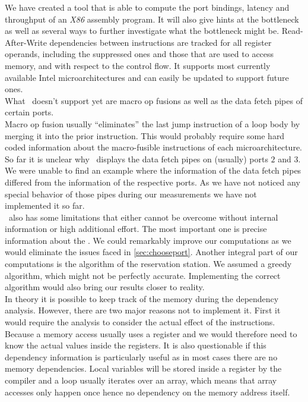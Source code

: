 
We have created a tool that is able to compute the port bindings, latency and throughput of an \emph{X86} assembly program. It will also give hints at the bottleneck as well as several ways to further investigate what the bottleneck might be. Read-After-Write dependencies between instructions are tracked for all register operands, including the suppressed ones and those that are used to access memory, and with respect to the control flow. It supports most currently available Intel microarchitectures and can easily be updated to support future ones.\\

What \suaca\ doesn't support yet are macro op fusions as well as the data fetch pipes of certain ports.\\
Macro op fusion usually ``eliminates'' the last jump instruction of a loop body by merging it into the prior instruction. This would probably require some hard coded information about the macro-fusible instructions of each microarchitecture.\\
So far it is unclear why \iaca\ displays the data fetch pipes on (usually) ports $2$ and $3$. We were unable to find an example where the information of the data fetch pipes differed from the information of the respective ports. As we have not noticed any special behavior of those pipes during our measurements we have not implemented it so far.\\

\suaca\ also has some limitations that either cannot be overcome without internal information or high additional effort.
The most important one is precise information about the \microops. We could remarkably improve our computations as we would eliminate the issues faced in \autoref{sec:chooseport}. Another integral part of our computations is the algorithm of the reservation station. We assumed a greedy algorithm, which might not be perfectly accurate. Implementing the correct algorithm would also bring our results closer to reality.\\
In theory it is possible to keep track of the memory during the dependency analysis. However, there are two major reasons not to implement it. First it would require the analysis to consider the actual effect of the instructions. Because a memory access usually uses a register and we would therefore need to know the actual values inside the registers. It is also questionable if this dependency information is particularly useful as in most cases there are no memory dependencies. Local variables will be stored inside a register by the compiler and a loop usually iterates over an array, which means that array accesses only happen once hence no dependency on the memory address itself.